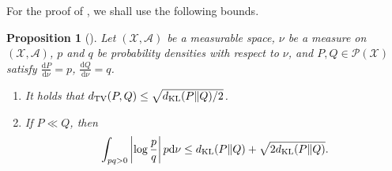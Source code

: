 \documentclass[a4paper]{scrartcl}
\newtheorem{proposition}[theorem]{Proposition}
\theoremstyle{definition}
\numberwithin{equation}{section}
\newcommand{\rd}{\mathrm{d}}
\newcommand{\Abs}[1]{\left\vert#1\right\vert}
\newcommand{\KL}[0]{\textup{KL}}
\newcommand{\TV}[0]{\textup{TV}}
\begin{document}
For the proof of , we shall use the following bounds.
\begin{proposition}[{\cite[Proposition 6.1.7]{GineNickl2016}}]
 \label{proposition_bounds_for_KL}
 Let $(\mathcal{X},\mathcal{A})$ be a measurable space, $\nu$ be a measure on $(\mathcal{X},\mathcal{A})$, $p$ and $q$ be probability densities with respect to $\nu$, and $P,Q\in\mathcal{P}(\mathcal{X})$ satisfy $\tfrac{\rd P}{\rd \nu}=p$, $\tfrac{\rd Q}{\rd \nu}=q$.
 \begin{enumerate}
  \item \label{proposition_bounds_for_KL_item1}
  It holds that $d_{\TV}(P,Q)\leq \sqrt{d_{\KL}(P\Vert Q)/2}$. 
  \item \label{proposition_bounds_for_KL_item2}
  If $P\ll Q$, then 
 \begin{equation*}
    \int_{pq>0} \Abs{\log \frac{p}{q}}p\rd \nu\leq d_{\KL}(P\Vert Q)+\sqrt{2 d_{\KL}(P\Vert Q)}.
  \end{equation*}  
 \end{enumerate}
\end{proposition}
\end{document}
